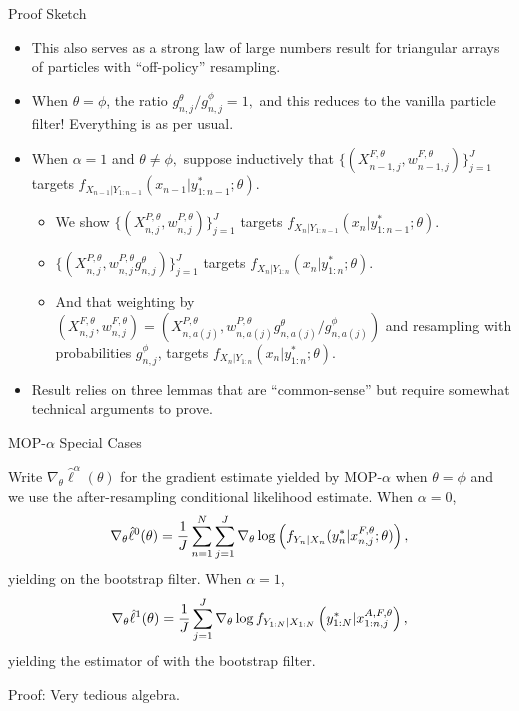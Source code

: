 \documentclass{beamer}
\begin{document}
\begin{frame}{Proof Sketch}
    \begin{itemize}
        \item This also serves as a strong law of large numbers result for triangular arrays of particles with ``off-policy'' resampling.\pause
        \item When $\theta=\phi$, the ratio ${g_{n,j}^\theta}/{g_{n,j}^\phi}=1,$ and this reduces to the vanilla particle filter! Everything is as per usual. \pause
        \item  When $\alpha=1$ and $\theta\neq\phi,$ suppose inductively that $\{(X^{F,\theta}_{n-1,j},w^{F,\theta}_{n-1,j})\}_{j=1}^J$ targets $f_{X_{n-1}|Y_{1:n-1}}(x_{n-1}|y^*_{1:n-1};\theta)$.\pause 
        \begin{itemize}
            \item We show $\{(X^{P,\theta}_{n,j},w^{P,\theta}_{n,j})\}_{j=1}^J$ targets $f_{X_{n}|Y_{1:n-1}}(x_{n}|y^*_{1:n-1};\theta)$.\pause
            \item $\{(X^{P,\theta}_{n,j},w^{P,\theta}_{n,j} g^\theta_{n,j} )\}_{j=1}^J$ targets  $f_{X_{n}|Y_{1:n}}(x_{n}|y^*_{1:n};\theta)$. \pause
            \item And that weighting by $(X^{F,\theta}_{n,j},w^{F,\theta}_{n,j}) = (X^{P,\theta}_{n,a(j)}, w^{P,\theta}_{n,a(j)} g^\theta_{n,a(j)}/ g^\phi_{n,a(j)})$ and resampling with probabilities $g^\phi_{n,j}$, targets $f_{X_{n}|Y_{1:n}}(x_{n}|y^*_{1:n};\theta)$.\pause
        \end{itemize}
        \item Result relies on three lemmas that are ``common-sense'' but require somewhat technical arguments to prove. 
    \end{itemize}
\end{frame}

\begin{frame}{MOP-$\alpha$ Special Cases}
    \begin{thm}
    \label{thm:mop-functional-forms}
    Write $\nabla_\theta \hat\ell^\alpha(\theta)$ for the gradient estimate yielded by MOP-$\alpha$ when $\theta=\phi$ and we use the after-resampling conditional likelihood estimate. When $\alpha=0$,
    \pause
    \begin{equation}
        \nabla_\theta \hat\ell^0(\theta) 
        = \frac{1}{J} \sum_{n=1}^N \sum_{j=1}^J \nabla_\theta \log\left(f_{Y_n|X_{n}}(y_n^*|x_{n,j}^{F, \theta}; \theta)\right),
        \vspace*{-2.5mm}
    \end{equation}
    \pause
    yielding \cite{blei2018vsmc} on the bootstrap filter. When $\alpha=1$,
    \pause
    \begin{equation}
        \nabla_\theta \hat{\ell}^1(\theta) 
        = \frac{1}{J}\sum_{j=1}^J \nabla_\theta \log f_{Y_{1:N}|X_{1:N}}\left(y_{1:N}^* | x_{1:n,j}^{A, F,\theta}\right),
    \vspace*{-2.5mm}
    \end{equation}
    \pause
    yielding the estimator of \cite{poyiadjis11} with the bootstrap filter.
\end{thm}
\pause
Proof: Very tedious algebra.
\end{frame}
\end{document}
